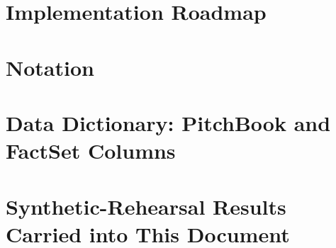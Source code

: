 \documentclass[11pt,a4paper,twoside,openany]{book}
\theoremstyle{plain}
\theoremstyle{definition}
\theoremstyle{remark}
\begin{document}
\chapter{Implementation Roadmap}\label{ch:roadmap}


\appendix
\chapter{Notation}\label{app:notation}


\chapter{Data Dictionary: PitchBook and FactSet Columns}\label{app:columns}


\chapter{Synthetic-Rehearsal Results Carried into This Document}\label{app:results}


\backmatter


\end{document}
